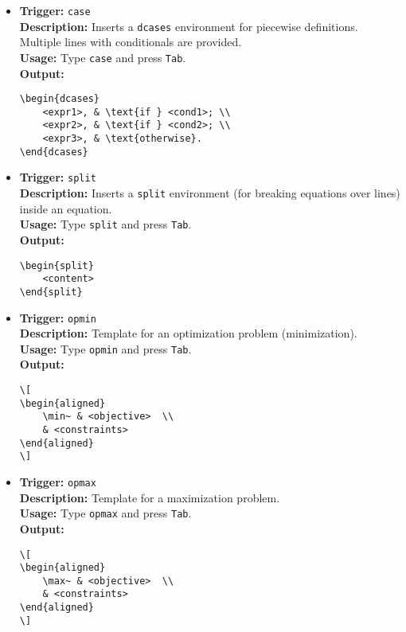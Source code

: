 \documentclass{article}
\begin{document}
\begin{itemize}[leftmargin=*, label={}]
\item \textbf{Trigger:} \texttt{case} \\
\textbf{Description:} Inserts a \texttt{dcases} environment for piecewise definitions. Multiple lines with conditionals are provided. \\
\textbf{Usage:} Type \texttt{case} and press \texttt{Tab}. \\
\textbf{Output:}
\begin{verbatim}
\begin{dcases}
    <expr1>, & \text{if } <cond1>; \\
    <expr2>, & \text{if } <cond2>; \\
    <expr3>, & \text{otherwise}.
\end{dcases}
\end{verbatim}

\item \textbf{Trigger:} \texttt{split} \\
\textbf{Description:} Inserts a \texttt{split} environment (for breaking equations over lines) inside an equation. \\
\textbf{Usage:} Type \texttt{split} and press \texttt{Tab}. \\
\textbf{Output:}
\begin{verbatim}
\begin{split}
    <content>
\end{split}
\end{verbatim}

\item \textbf{Trigger:} \texttt{opmin} \\
\textbf{Description:} Template for an optimization problem (minimization). \\
\textbf{Usage:} Type \texttt{opmin} and press \texttt{Tab}. \\
\textbf{Output:}
\begin{verbatim}
\[
\begin{aligned}
    \min~ & <objective>  \\
    & <constraints>
\end{aligned}
\]
\end{verbatim}

\item \textbf{Trigger:} \texttt{opmax} \\
\textbf{Description:} Template for a maximization problem. \\
\textbf{Usage:} Type \texttt{opmax} and press \texttt{Tab}. \\
\textbf{Output:}
\begin{verbatim}
\[
\begin{aligned}
    \max~ & <objective>  \\
    & <constraints>
\end{aligned}
\]
\end{verbatim}


\end{itemize}
\end{document}
